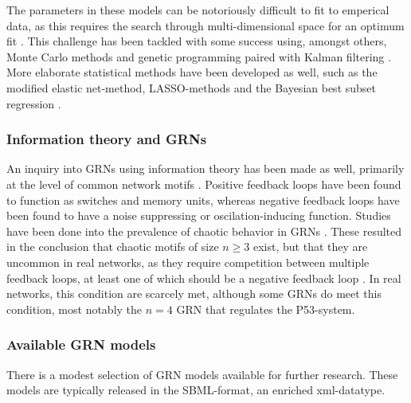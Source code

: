 \documentclass[../main.tex]{subfiles}
\begin{document}
The parameters in these models can be notoriously difficult to fit to emperical data, as this requires the search through multi-dimensional space for an optimum fit \cite{bolouri2002modeling, kuhn2009monte}.
This challenge has been tackled with some success using, amongst others, Monte Carlo methods and genetic programming paired with Kalman filtering \cite{qian2008inference, kuhn2009monte}.
More elaborate statistical methods have been developed as well, such as the modified elastic net-method, LASSO-methods and the Bayesian best subset regression \cite{greenfield2013robust, wu2014sparse}.

\subsubsection{Information theory and GRNs}

An inquiry into GRNs using information theory has been made as well, primarily at the level of common network motifs \cite{zhang2012chaotic}.
Positive feedback loops have been found to function as switches and memory units, whereas negative feedback loops have been found to have a noise suppressing or oscilation-inducing function.
Studies have been done into the prevalence of chaotic behavior in GRNs \cite{zhang2012chaotic}.
These resulted in the conclusion that chaotic motifs of size $n\ge 3$ exist, but that they are uncommon in real networks, as they require competition between multiple feedback loops, at least one of which should be a negative feedback loop \cite{zhang2012chaotic}.
In real networks, this condition are scarcely met, although some GRNs do meet this condition, most notably the $n=4$ GRN that regulates the P53-system.

\subsubsection{Available GRN models}

There is a modest selection of GRN models available for further research.
These models are typically released in the SBML-format, an enriched xml-datatype.
\end{document}
